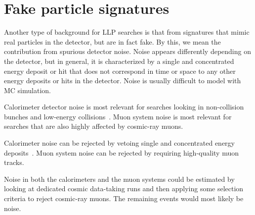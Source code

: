 
\section{Fake particle signatures} %

Another type of background for LLP searches is that from signatures that mimic real particles in the detector, but are in fact fake. By this, we mean the contribution from spurious detector noise. Noise appears differently depending on the detector, but in general, it is characterized by a single and concentrated energy deposit or hit that does not correspond in time or space to any other energy deposits or hits in the detector. Noise is usually difficult to model with MC simulation.

Calorimeter detector noise is most relevant for searches looking in non-collision bunches and low-energy collisions~\cite{Khachatryan:2015jha, Chatrchyan:2012dxa, Khachatryan:2010uf}. Muon system noise is most relevant for searches that are also highly affected by cosmic-ray muons.

Calorimeter noise can be rejected by vetoing single and concentrated energy deposits~\cite{Khachatryan:2015jha, Chatrchyan:2012dxa, Khachatryan:2010uf}. Muon system noise can be rejected by requiring high-quality muon tracks.

Noise in both the calorimeters and the muon systems could be estimated by looking at dedicated cosmic data-taking runs and then applying some selection criteria to reject cosmic-ray muons. The remaining events would most likely be noise.

